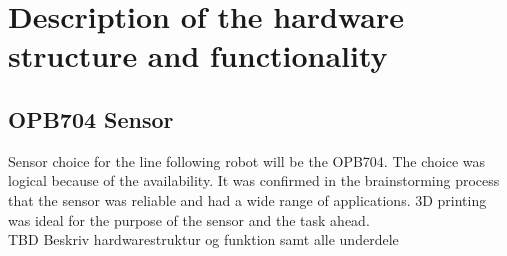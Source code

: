 \section{Description of the hardware structure and functionality}
\subsection{OPB704 Sensor}
Sensor choice for the line following robot will be the OPB704. The choice was logical because of the availability. It was confirmed in the brainstorming process that the sensor was reliable and had a wide range of applications. 3D printing was ideal for the purpose of the sensor and the task ahead.
\newline 
\\
TBD Beskriv hardwarestruktur og funktion samt alle underdele
